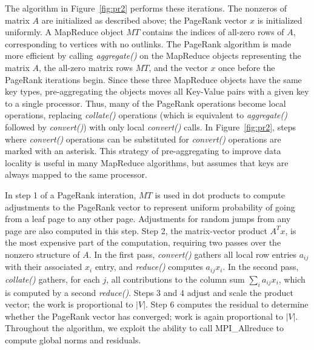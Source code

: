 The algorithm in Figure~\ref{fig:pr2} performs these
iterations.  The nonzeros of matrix $A$ are initialized as described above;
the PageRank vector $x$ is initialized uniformly.  A MapReduce object $MT$
contains the indices of all-zero rows of $A$, corresponding to vertices
with no outlinks.  
The PageRank algorithm is made more efficient by calling
{\it aggregate()} on the MapReduce objects representing the matrix $A$, 
the all-zero matrix rows $MT$, and the vector $x$ once before the PageRank 
iterations begin.  Since these three MapReduce
objects have the same key types, pre-aggregating the objects moves all
Key-Value pairs with a given key to a single processor.  Thus, many of
the PageRank operations become local operations, replacing 
{\it collate()} operations (which is equivalent to {\it aggregate()} 
followed by {\it convert()}) with only local {\it convert()} calls. 
In Figure~\ref{fig:pr2}, steps where {\it convert()} operations can be
substituted for {\it convert()} operations are marked with an asterisk.
This strategy of pre-aggregating to improve data locality is useful in
many MapReduce algorithms, but assumes that keys are always mapped to
the same processor.

In step 1 of a PageRank interation, $MT$ is used 
in dot products to compute adjustments to the
PageRank vector to represent uniform probability of going from a leaf page
to any other page.  Adjustments for random jumps from any page are also
computed in this step.  Step 2, the matrix-vector product $A^T x$, is the most
expensive part of the computation, requiring two passes over the nonzero
structure of $A$.  In the first pass, {\it convert()} 
gathers all local row entries $a_{ij}$ with their
associated $x_i$ entry, and {\it reduce()} computes $a_{ij} x_i$.  
In the second pass, 
{\it collate()} gathers, for each $j$, all contributions to the
column sum $\sum_i a_{ij} x_i$, which is computed by a second {\it reduce()}. 
Steps 3 and 4 adjust and scale the 
product vector; the work is proportional to $|V|$.  Step 6 computes the
residual to determine whether the PageRank vector has converged; work is
again proportional to $|V|$.  Throughout the algorithm, we exploit the
ability to call MPI\_Allreduce to compute global norms and residuals. 


